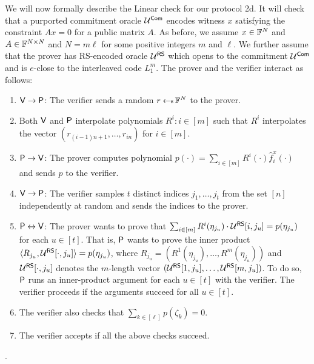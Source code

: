 We will now formally describe the Linear check for our protocol \name2d{}. It will check that a purported commitment oracle
$\mathcal{U}^{\mathsf{Com}}$ encodes witness $x$ satisfying the constraint $Ax=0$ for a public
matrix $A$. As before, we assume $x\in \mathbb{F}^N$ and $A\in \mathbb{F}^{N\times N}$ and
$N=m\ell$ for some positive integers $m$ and $\ell$. We further assume that
the prover has RS-encoded oracle $\mathcal{U}^{\mathsf{RS}}$ which opens to the commitment
$\mathcal{U}^{\mathsf{Com}}$ and is $e$-close to the interleaved code $L_1^{m}$. 
The prover and the verifier interact as follows:
\begin{enumerate}[{\rm 1.}]
\item $\mathsf{V}\rightarrow\mathsf{P}$: The verifier sends a random $r\hskip2.3pt{\gets\!\!\mbox{\tiny${\$}$\normalsize}}\,
\mathbb{F}^N$ to the prover.

\item Both $\mathsf{V}$ and $\mathsf{P}$ interpolate polynomials $R^i:i\in [m]$ such that $R^i$ interpolates the
vector $(r_{(i-1)n+1},\ldots,r_{in})$ for $i\in [m]$. 

\item $\mathsf{P}\rightarrow\mathsf{V}$: The prover computes polynomial 
$p(\cdot)=\sum_{i\in [m]}R^i(\cdot)\hat{f}^x_{i}(\cdot)$ and sends $p$ to the verifier.

\item $\mathsf{V}\rightarrow\mathsf{P}$: The verifier samples $t$ distinct indices
$j_1,\ldots,j_t$ from the set $[n]$ independently at random and sends the indices to the prover.

\item $\mathsf{P}\leftrightarrow\mathsf{V}$: The prover wants to prove that 
$\sum_{i\in [m]} R^i(\eta_{j_u}) \cdot \mathcal{U}^{\mathsf{RS}}[i, j_u] = p(\eta_{j_u})$ for each $u \in [t]$.
That is, $\mathsf{P}$ wants to prove the inner product $\langle R_{j_u},\mathcal{U}^{\mathsf{RS}}[\cdot,j_u]\rangle = p(\eta_{j_u})$,
where $R_{j_u} = (R^1(\eta_{j_u}), \ldots, R^m(\eta_{j_u}))$ and 
$\mathcal{U}^{\mathsf{RS}}[\cdot, j_u]$ denotes the $m$-length vector $(\mathcal{U}^{\mathsf{RS}}[1, j_u], \ldots, \mathcal{U}^{\mathsf{RS}}[m, j_u])$.
To do so, $\mathsf{P}$ runs an inner-product argument for each $u \in [t]$ with the verifier. The verifier proceeds if the arguments succeed for all $u \in [t]$.

\item The verifier also checks that $\sum_{k\in [\ell]}p(\zeta_k)=0$.
\item The verifier accepts if all the above checks succeed.
\end{enumerate}
.


